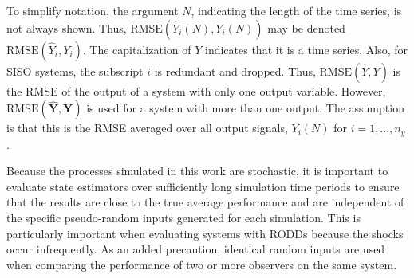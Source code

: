 {To simplify notation, the argument $N$, indicating the length of the time series, is not always shown. Thus, $\textrm{RMSE}(\hat{Y}_i(N),Y_i(N))$ may be denoted $\textrm{RMSE}(\hat{Y}_i,Y_i)$. The capitalization of $Y$ indicates that it is a time series. Also, for \gls{SISO} systems, the subscript $i$ is redundant and dropped. Thus, $\textrm{RMSE}(\hat{Y},Y)$ is the \gls{RMSE} of the output of a system with only one output variable. However, $\textrm{RMSE}(\hat{\mathbf{Y}},\mathbf{Y})$ is used for a system with more than one output. The assumption is that this is the \gls{RMSE} averaged over all output signals, $Y_i(N)$ for $i=1, ..., n_y$.
%

Because the processes simulated in this work are stochastic, it is important to evaluate state estimators over sufficiently long simulation time periods to ensure that the results are close to the true average performance and are independent of the specific pseudo-random inputs generated for each simulation. This is particularly important when evaluating systems with \gls{RODD}s because the shocks occur infrequently. As an added precaution, identical random inputs are used when comparing the performance of two or more observers on the same system.

}
